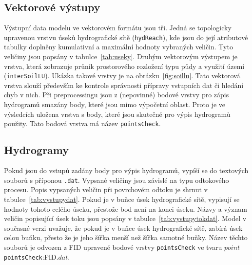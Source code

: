 \subsection{Vektorové výstupy}\label{sec:vektor}

Výstupní data modelu ve vektorovém formátu jsou tři. Jedná se topologicky upravenou vrstvu úseků hydrografické sítě ({\tt hydReach}), kde jsou do její atributové tabulky doplněny kumulativní a maximální hodnoty vybraných veličin. Tyto veličiny jsou popsány v tabulce~\ref{tab:useky}. Druhým vektorovým výstupem je vrstva, která zobrazuje průnik prostorového rozložení typu půdy a využití území ({\tt interSoilLU}). Ukázka takové vrstvy je na obrázku~\ref{fig:soillu}. Tato vektorová vrstva slouží především ke kontrole správnosti přípravy vstupních dat či hledání chyb v nich. Při preprocessingu jsou  z (nepovinné) bodové vrstvy pro zápis hydrogramů smazány body, které jsou mimo výpočetní oblast. Proto je ve výsledcích uložena vrstva s body, které jsou skutečné pro výpis hydrogramů použity. Tato bodová vrstva má název {\tt pointsCheck}. 













\subsection{Hydrogramy}\label{sec:hydrogramy}

Pokud jsou do vstupů zadány body pro výpis hydrogramů, vypíší se do textových souborů s příponou {\tt.dat}. Vypsané veličiny jsou závislé na typu odtokového procesu. Popis vypsaných veličin při povrchovém odtoku je shrnut v tabulce~\ref{tab:vystupydat}. Pokud je v buňce úsek hydrografické sítě, vypisují se hodnoty tohoto celého úseku, přestože bod není na konci úseku.  Názvy a význam veličin popisující úsek toku jsou popsány v tabulce~\ref{tab:vystupytokdat}.  Model v současné verzi uvažuje, že pokud je v buňce úsek hydrografické sítě, zabírá úsek celou buňku, přesto že je jeho šířka menší než šířka samotné buňky.  Název těchto souborů je odvozen z FID upravené bodové vrstvy {\tt pointsCheck} ve tvaru $point${{\tt pointsCheck}:FID}$.dat$. 








